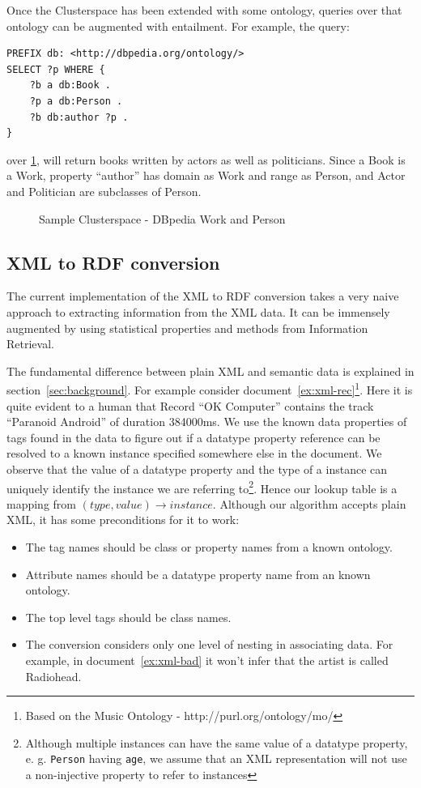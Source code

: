 \documentclass[conference]{IEEEtran}
\begin{document}
Once the Clusterspace has been extended with some ontology, queries over that
ontology can be augmented with entailment. For example, the query:

\begin{verbatim}
PREFIX db: <http://dbpedia.org/ontology/>
SELECT ?p WHERE {
    ?b a db:Book .
    ?p a db:Person .
    ?b db:author ?p .
}
\end{verbatim}

over \ref{fig:person-cs-example}, will return books written by actors as well
as politicians. Since a Book is a Work, property ``author'' has domain as Work
and range as Person, and Actor and Politician are subclasses of Person.

\begin{figure}
    \caption{Sample Clusterspace - DBpedia Work and Person}
    \label{fig:person-cs-example}
\end{figure}

\subsection{XML to RDF conversion}

The current implementation of the XML to RDF conversion takes a very naive
approach to extracting information from the XML data. It can be immensely
augmented by using statistical properties and methods from Information
Retrieval.

The fundamental difference between plain XML and semantic data is explained in
section~\ref{sec:background}. For example consider
document~\ref{ex:xml-rec}\footnote{Based on the Music Ontology
- http://purl.org/ontology/mo/}. Here it is quite evident to a human that
Record ``OK Computer'' contains the track ``Paranoid Android'' of duration
384000ms. We use the known data properties of tags found in the data to figure
out if a datatype property reference can be resolved to a known instance
specified somewhere else in the document. We observe that the value of
a datatype property and the type of a instance can uniquely identify the
instance we are referring to\footnote{Although multiple instances can have the
    same value of a datatype property, e. g. \texttt{Person} having
    \texttt{age}, we assume that an XML representation will not use
a non-injective property to refer to instances}. Hence our lookup table is
a mapping from $(type, value)\rightarrow instance$. Although our algorithm
accepts plain XML, it has some preconditions for it to work:

\begin{itemize}
    \item The tag names should be class or property names from a known ontology.
    \item Attribute names should be a datatype property name from an known
        ontology.
    \item The top level tags should be class names.
    \item The conversion considers only one level of nesting in associating
        data. For example, in document~\ref{ex:xml-bad} it won't infer that the
        artist is called Radiohead.
\end{itemize}
\end{document}
